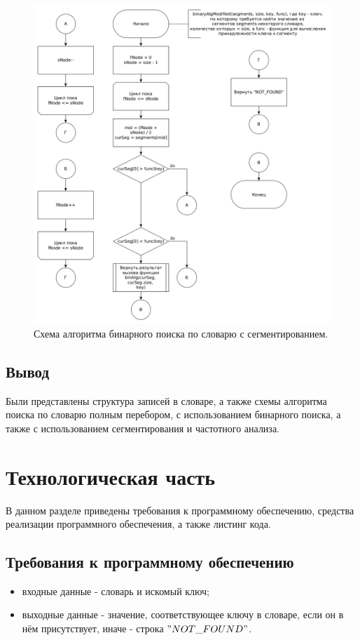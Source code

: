 \documentclass[12pt]{report}
\begin{document}
\begin{figure}
\begin{center}
\includegraphics[scale=0.4]{inc/img/binAlgUpd.png}
\captionsetup{justification=centering}
	\caption{Схема алгоритма бинарного поиска по словарю с сегментированием.}
	\label{img:brutAlgUpd}	
\end{center}
\end{figure}

\section*{Вывод}
Были представлены структура записей в словаре, а также схемы алгоритма поиска по словарю полным перебором, с использованием бинарного поиска, а также с использованием сегментирования и частотного анализа.

\chapter{Технологическая часть}
В данном разделе приведены требования к программному обеспечению, средства реализации программного обеспечения, а также листинг кода.

\section{Требования к программному обеспечению}
\begin{itemize}
\item входные данные - словарь и искомый ключ;
\item выходные данные - значение, соответствующее ключу в словаре, если он в нём присутствует, иначе - строка $"NOT\_FOUND"$.
\end{itemize}
\end{document}
